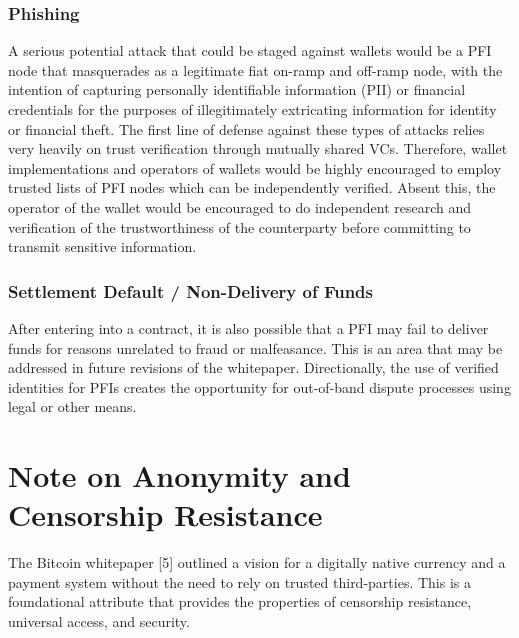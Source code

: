 \documentclass[11pt]{article}
\begin{document}
\subsubsection{Phishing}

A serious potential attack that could be staged against wallets would be a PFI node that masquerades as a legitimate fiat on-ramp and off-ramp node, with the intention of capturing personally identifiable information (PII) or financial credentials for the purposes of illegitimately extricating information for identity or financial theft. The first line of defense against these types of attacks relies very heavily on trust verification through mutually shared VCs. Therefore, wallet implementations and operators of wallets would be highly encouraged to employ trusted lists of PFI nodes which can be independently verified. Absent this, the operator of the wallet would be encouraged to do independent research and verification of the trustworthiness of the counterparty before committing to transmit sensitive information. 

\subsubsection{Settlement Default / Non-Delivery of Funds}

After entering into a contract, it is also possible that a PFI may fail to deliver funds for reasons unrelated to fraud or malfeasance. This is an area that may be addressed in future revisions of the whitepaper. Directionally, the use of verified identities for PFIs creates the opportunity for out-of-band dispute processes using legal or other means. \ \ \ \ \ \ \ \ \ \ \ \ \ \ \ \ \ \ \ \ \ \ \ \ \ \ \ \ \ \ \ \ \ \ \ \ \ \ \ \ \ \ \ \ \ \ \ \ \ \ 

\vspace{1\baselineskip}
\section{Note on Anonymity and Censorship Resistance}

\vspace{1\baselineskip}
The Bitcoin whitepaper [5] outlined a vision for a digitally native currency and a payment system without the need to rely on trusted third-parties. This is a foundational attribute that provides the properties of censorship resistance, universal access, and security. 
\end{document}
